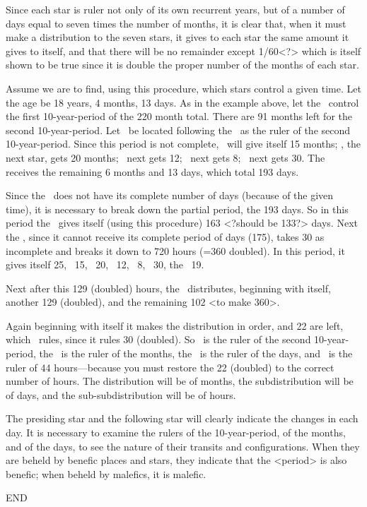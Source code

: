 Since each star is ruler not only of its own recurrent years, but of a number of days equal to seven times the number of months, it is clear that, when it must make a distribution to the seven stars, it gives to each star the same amount it gives to itself, and that there will be no remainder except 1/60<?> which is itself shown to be true since it is double the proper number of the months of each star.

Assume we are to find, using this procedure, which stars control a given time. Let the age be 18 years, 4 months, 13 days. As in the example above, let the \Moon\, control the first 10-year-period of the
220 month total. There are 91 months left for the second 10-year-period. Let \Mars\, be located following the \Moon\, as the ruler of the second 10-year-period. Since this period is not complete, \Mars\, will give itself 15 months; \Mercury, the next star, gets 20 months; \Jupiter\, next gets 12; \Venus\, next gets 8; \Saturn\, next gets 30. The \Sun\, receives the remaining 6 months and 13 days, which total 193 days. 

Since the \Sun\, does not have its complete number of days (because of the given time), it is necessary to break down the partial period, the 193 days. So in this period the \Sun\, gives itself (using this procedure) 163 <?should be 133?> days. Next the \Moon, since it cannot receive its complete period of days (175), takes 30 as incomplete and breaks it down to 720 hours (=360 doubled). In this period, it gives itself 25, \Mars\, 15, \Mercury\, 20, \Jupiter\, 12, \Venus\, 8, \Saturn\, 30, the \Sun\, 19. 

Next after this 129 (doubled) hours, the \Moon\, distributes, beginning with itself, another 129 (doubled), and the remaining 102 <to make 360>. 

Again beginning with itself it makes the distribution in order, and 22 are left, which \Saturn\, rules, since it rules 30 (doubled). So \Mars\, is the ruler of the second 10-year-period, the \Sun\, is the ruler of the months, the \Moon\, is the ruler of the days, and \Saturn\, is the ruler of 44 hours—because you must restore the 22 (doubled) to the correct number of hours. The distribution will be of months, the subdistribution will be of days, and the sub-subdistribution will be of hours.

The presiding star and the following star will clearly indicate the changes in each day. It is necessary to examine the rulers of the 10-year-period, of the months, and of the days, to see the nature of their transits and configurations. When they are beheld by benefic places and stars, they indicate that the <period> is also benefic; when beheld by malefics, it is malefic.

END



\newpage
